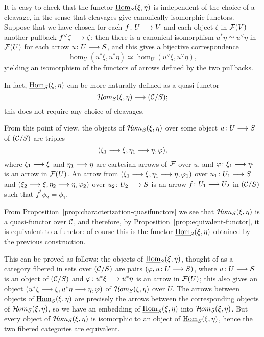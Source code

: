 \begin{3   FIBERED CATEGORIES}
\begin{3.7 The functors of arrows of a fibcat}
It is easy to check that the functor $\mathop{\underline{\mathrm{Hom}}}\nolimits_S(\xi, \eta)$ is independent of the choice of a cleavage, in the sense that cleavages give canonically isomorphic functors. Suppose that we have chosen for each $f \colon U \arr V$ and each object $\zeta$ in $\mathcal{F}(V)$ another pullback $f^\vee \zeta \arr \zeta$: then there is a canonical isomorphism $u^* \eta \simeq u^\vee \eta$ in $\mathcal{F}(U)$ for each arrow $u \colon U \arr S$, and this gives a bijective correspondence
   \[
   \hom_U(u^* \xi, u^* \eta) \simeq \hom_U(u^\vee
   \xi, u^\vee \eta),
   \]
yielding an isomorphism of the functors of arrows defined by the two pullbacks.

In fact, $\mathop{\underline{\mathrm{Hom}}}\nolimits_S(\xi, \eta)$ can be more naturally defined as a quasi-functor
   \[
   \curshom_S(\xi, \eta) \arr (\cC/S);
   \]
this does not require any choice of cleavages.

From this point of view, the objects of $\mathop{\mathcal{H}\hskip -.8pt om}\nolimits_S(\xi, \eta)$ over some object $u \colon U \arr S$ of $(\mathcal{C}/S)$ are triples
   \[
   (\xi_1 \arr \xi, \eta_1 \arr \eta, \phi),
   \]
where $\xi_1 \arr \xi$ and $\eta_1 \arr \eta$ are cartesian arrows of $\mathcal{F}$ over $u$, and $\phi \colon \xi_1 \arr \eta_1$ is an arrow in $\mathcal{F}(U)$. An arrow from $(\xi_1 \arr \xi, \eta_1 \arr \eta, \phi_1)$ over $u_1 \colon U_1 \arr S$ and $(\xi_2 \arr \xi, \eta_2 \arr \eta, \phi_2)$ over $u_2 \colon U_2 \arr S$ is an arrow $f \colon U_1 \arr U_2$ in $(\mathcal{C}/S)$ such that $f^*\phi_2 = \phi_1$.

From Proposition~\ref{prop:characterization-quasifunctors} we see that $\mathop{\mathcal{H}\hskip -.8pt om}\nolimits_S(\xi, \eta)$ is a quasi-functor over $\mathcal{C}$, and therefore, by Proposition~\ref{prop:equivalent-functor}, it is equivalent to a functor: of course this is the functor $\mathop{\underline{\mathrm{Hom}}}\nolimits_S(\xi, \eta)$ obtained by the previous construction.

This can be proved as follows: the objects of $\mathop{\underline{\mathrm{Hom}}}\nolimits_S(\xi, \eta)$, thought of as a category fibered in sets over $(\mathcal{C}/S)$ are pairs $(\phi, u \colon U \arr S)$, where $u \colon U \arr S$ is an object of $(\mathcal{C}/S)$ and $\phi \colon u^* \xi \arr u^* \eta$ is an arrow in $\mathcal{F}(U)$; this also gives an object $(u^* \xi \arr \xi, u^*\eta \arr \eta, \phi)$ of $\mathop{\mathcal{H}\hskip -.8pt om}\nolimits_S(\xi, \eta)$ over $U$. The arrows between objects of $\mathop{\underline{\mathrm{Hom}}}\nolimits_S(\xi, \eta)$ are precisely the arrows between the corresponding objects of $\mathop{\mathcal{H}\hskip -.8pt om}\nolimits_S(\xi, \eta)$, so we have an embedding of $\mathop{\underline{\mathrm{Hom}}}\nolimits_S(\xi, \eta)$ into $\mathop{\mathcal{H}\hskip -.8pt om}\nolimits_S(\xi, \eta)$. But every object of $\mathop{\mathcal{H}\hskip -.8pt om}\nolimits_S(\xi, \eta)$ is isomorphic to an object of $\mathop{\underline{\mathrm{Hom}}}\nolimits_S(\xi, \eta)$, hence the two fibered categories are equivalent.



\end{3.7 The functors of arrows of a fibcat}
\end{3   FIBERED CATEGORIES}
